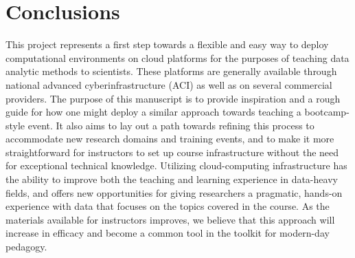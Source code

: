 \section{Conclusions}

This project represents a first step towards a flexible and easy way to deploy
computational environments on cloud platforms for the purposes of teaching
data analytic methods to scientists. These platforms are generally available
through national advanced cyberinfrastructure (ACI) as well as on several
commercial providers. The purpose of this manuscript is to provide inspiration
and a rough guide for how one might deploy a similar approach towards teaching a
bootcamp-style event. It also aims to lay out a path towards refining this
process to accommodate new research domains and training events, and to make it
more straightforward for instructors to set up course infrastructure without the
need for exceptional technical knowledge. Utilizing cloud-computing
infrastructure has the ability to improve both the teaching and learning
experience in data-heavy fields, and offers new opportunities for giving
researchers a pragmatic, hands-on experience with data that focuses on the
topics covered in the course. As the materials available for instructors
improves, we believe that this approach will increase in efficacy and become a
common tool in the toolkit for modern-day pedagogy.
